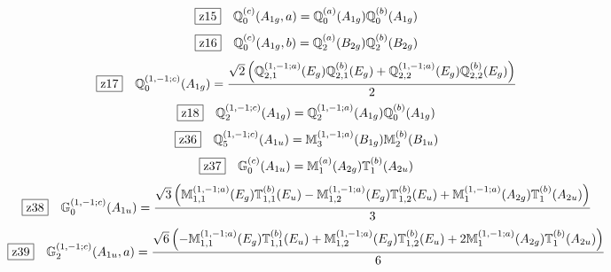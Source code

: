 \documentclass[fleqn,10pt,landscape]{jsarticle}
\begin{document}
\begin{dmath*}
\hspace*{3mm}\fbox{z15}\quad \mathbb{Q}_{0}^{(c)}(A_{1g},a)=\mathbb{Q}_{0}^{(a)}(A_{1g}) \mathbb{Q}_{0}^{(b)}(A_{1g})
\end{dmath*}
\begin{dmath*}
\hspace*{3mm}\fbox{z16}\quad \mathbb{Q}_{0}^{(c)}(A_{1g},b)=\mathbb{Q}_{2}^{(a)}(B_{2g}) \mathbb{Q}_{2}^{(b)}(B_{2g})
\end{dmath*}
\begin{dmath*}
\hspace*{3mm}\fbox{z17}\quad \mathbb{Q}_{0}^{(1,-1;c)}(A_{1g})=\frac{\sqrt{2} \left(\mathbb{Q}_{2,1}^{(1,-1;a)}(E_{g}) \mathbb{Q}_{2,1}^{(b)}(E_{g}) + \mathbb{Q}_{2,2}^{(1,-1;a)}(E_{g}) \mathbb{Q}_{2,2}^{(b)}(E_{g})\right)}{2}
\end{dmath*}
\begin{dmath*}
\hspace*{3mm}\fbox{z18}\quad \mathbb{Q}_{2}^{(1,-1;c)}(A_{1g})=\mathbb{Q}_{2}^{(1,-1;a)}(A_{1g}) \mathbb{Q}_{0}^{(b)}(A_{1g})
\end{dmath*}
\begin{dmath*}
\hspace*{3mm}\fbox{z36}\quad \mathbb{Q}_{5}^{(1,-1;c)}(A_{1u})=\mathbb{M}_{3}^{(1,-1;a)}(B_{1g}) \mathbb{M}_{2}^{(b)}(B_{1u})
\end{dmath*}
\begin{dmath*}
\hspace*{3mm}\fbox{z37}\quad \mathbb{G}_{0}^{(c)}(A_{1u})=\mathbb{M}_{1}^{(a)}(A_{2g}) \mathbb{T}_{1}^{(b)}(A_{2u})
\end{dmath*}
\begin{dmath*}
\hspace*{3mm}\fbox{z38}\quad \mathbb{G}_{0}^{(1,-1;c)}(A_{1u})=\frac{\sqrt{3} \left(\mathbb{M}_{1,1}^{(1,-1;a)}(E_{g}) \mathbb{T}_{1,1}^{(b)}(E_{u}) - \mathbb{M}_{1,2}^{(1,-1;a)}(E_{g}) \mathbb{T}_{1,2}^{(b)}(E_{u}) + \mathbb{M}_{1}^{(1,-1;a)}(A_{2g}) \mathbb{T}_{1}^{(b)}(A_{2u})\right)}{3}
\end{dmath*}
\begin{dmath*}
\hspace*{3mm}\fbox{z39}\quad \mathbb{G}_{2}^{(1,-1;c)}(A_{1u},a)=\frac{\sqrt{6} \left(- \mathbb{M}_{1,1}^{(1,-1;a)}(E_{g}) \mathbb{T}_{1,1}^{(b)}(E_{u}) + \mathbb{M}_{1,2}^{(1,-1;a)}(E_{g}) \mathbb{T}_{1,2}^{(b)}(E_{u}) + 2 \mathbb{M}_{1}^{(1,-1;a)}(A_{2g}) \mathbb{T}_{1}^{(b)}(A_{2u})\right)}{6}
\end{dmath*}
\end{document}
